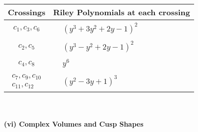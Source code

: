 \documentclass[1p]{elsarticle_modified}
\theoremstyle{definition}
\begin{document}
\begin{tabular}{m{50pt}|m{274pt}}
Crossings & \hspace{64pt}Riley Polynomials at each crossing \\
\hline $$\begin{aligned}c_{1},c_{3},c_{6}\end{aligned}$$&$\begin{aligned}
&(y^3+3 y^2+2 y-1)^2
\end{aligned}$\\
\hline $$\begin{aligned}c_{2},c_{5}\end{aligned}$$&$\begin{aligned}
&(y^3- y^2+2 y-1)^2
\end{aligned}$\\
\hline $$\begin{aligned}c_{4},c_{8}\end{aligned}$$&$\begin{aligned}
&y^6
\end{aligned}$\\
\hline $$\begin{aligned}c_{7},c_{9},c_{10}\\c_{11},c_{12}\end{aligned}$$&$\begin{aligned}
&(y^2-3 y+1)^3
\end{aligned}$\\
\hline
\end{tabular}\\~\\
\newpage\flushleft \textbf{(vi) Complex Volumes and Cusp Shapes}
\end{document}
